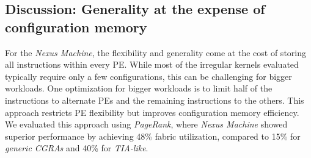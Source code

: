
\subsection{Discussion: Generality at the expense of configuration memory}
For the \textit{Nexus Machine}, the flexibility and generality come at the cost of storing all instructions within every PE.
While most of the irregular kernels evaluated typically require only a few configurations, this can be challenging for bigger workloads. 
One optimization for bigger workloads is to limit half of the instructions to alternate PEs and the remaining instructions to the others.
This approach restricts PE flexibility but improves configuration memory efficiency.
We evaluated this approach using \textit{PageRank}, where \textit{Nexus Machine} showed superior performance by achieving 48\% fabric utilization, compared to 15\% for \textit{generic CGRAs} and 40\% for \textit{TIA-like}.